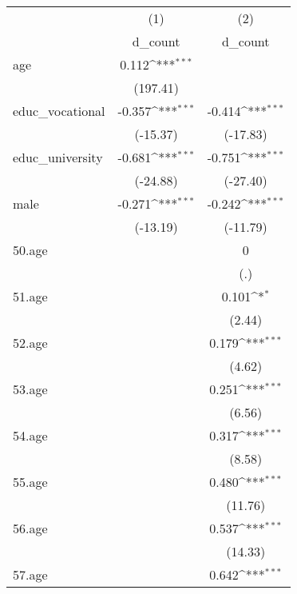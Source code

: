 {
\def\sym#1{\ifmmode^{#1}\else\(^{#1}\)\fi}
\begin{tabular}{l*{2}{c}}
\hline\hline
            &\multicolumn{1}{c}{(1)}&\multicolumn{1}{c}{(2)}\\
            &\multicolumn{1}{c}{d\_count}&\multicolumn{1}{c}{d\_count}\\
\hline
age         &       0.112\sym{***}&                     \\
            &    (197.41)         &                     \\
[1em]
educ\_vocational&      -0.357\sym{***}&      -0.414\sym{***}\\
            &    (-15.37)         &    (-17.83)         \\
[1em]
educ\_university&      -0.681\sym{***}&      -0.751\sym{***}\\
            &    (-24.88)         &    (-27.40)         \\
[1em]
male        &      -0.271\sym{***}&      -0.242\sym{***}\\
            &    (-13.19)         &    (-11.79)         \\
[1em]
50.age      &                     &           0         \\
            &                     &         (.)         \\
[1em]
51.age      &                     &       0.101\sym{*}  \\
            &                     &      (2.44)         \\
[1em]
52.age      &                     &       0.179\sym{***}\\
            &                     &      (4.62)         \\
[1em]
53.age      &                     &       0.251\sym{***}\\
            &                     &      (6.56)         \\
[1em]
54.age      &                     &       0.317\sym{***}\\
            &                     &      (8.58)         \\
[1em]
55.age      &                     &       0.480\sym{***}\\
            &                     &     (11.76)         \\
[1em]
56.age      &                     &       0.537\sym{***}\\
            &                     &     (14.33)         \\
[1em]
57.age      &                     &       0.642\sym{***}\\

\end{tabular}}
